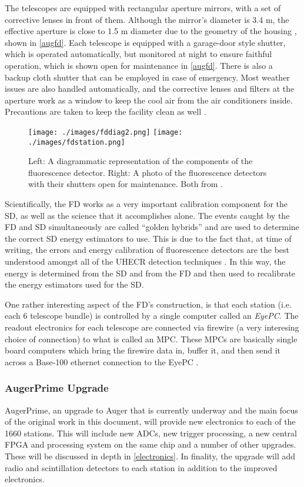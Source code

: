 The telescopes are equipped with rectangular aperture mirrors, with a set of corrective lenses in front of them. Although the mirror's diameter is 3.4 m, the effective aperture is close to 1.5 m diameter due to the geometry of the housing \cite{fddiam}, shown in \autoref{augfd}. Each telescope is equipped with a garage-door style shutter, which is operated automatically, but monitored at night to ensure faithful operation, which is shown open for maintenance in \autoref{augfd}. There is also a backup cloth shutter that can be employed in case of emergency. Most weather issues are also handled automatically, and the corrective lenses and filters at the aperture work as a window to keep the cool air from the air conditioners inside. Precautions are taken to keep the facility clean as well \cite{auger2015}. 
\begin{figure}[h!]
\begin{center}
\texttt{[image: ./images/fddiag2.png]}
\texttt{[image: ./images/fdstation.png]}
\caption[Auger Fluorescence Detector]{Left: A diagrammatic representation of the components of the fluorescence detector. Right: A photo of the fluorescence detectors with their shutters open for maintenance. Both from \cite{auger2015}.}
\label{augfd}
\end{center}
\end{figure}
Scientifically, the FD works as a very important calibration component for the SD, as well as the science that it accomplishes alone. The events caught by the FD and SD simultaneously are called ``golden hybrids'' and are used to determine the correct SD energy estimators to use. This is due to the fact that, at time of writing, the errors and energy calibration of fluorescence detectors are the best understood amongst all of the UHECR detection techniques \cite{schroeder}. In this way, the energy is determined from the SD and from the FD and then used to recalibrate the energy estimators used for the SD.

One rather interesting aspect of the FD's construction, is that each station (i.e. each 6 telescope bundle) is controlled by a single computer called an \textit{EyePC}. The readout electronics for each telescope are connected via firewire (a very interesing choice of connection) to what is called an MPC. These MPCs are basically single board computers which bring the firewire data in, buffer it, and then send it across a Base-100 ethernet connection to the EyePC \cite{auger2015}.
\subsubsection{AugerPrime Upgrade}
AugerPrime, an upgrade to Auger that is currently underway and the main focus of the original work in this document, will provide new electronics to each of the 1660 stations. This will include new ADCs, new trigger processing, a new central FPGA and processing system on the same chip and a number of other upgrades. These will be discussed in depth in \autoref{electronics}. In finality, the upgrade will add radio and scintillation detectors to each station in addition to the improved electronics.
